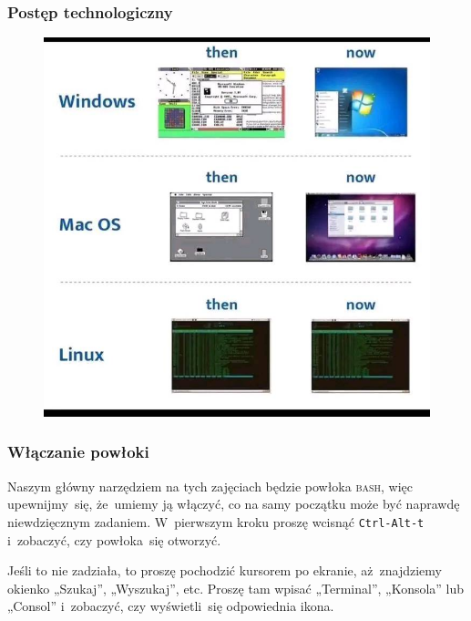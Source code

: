 \documentclass[10pt,t]{beamer}
\begin{document}
\begin{frame}
  \frametitle{Postęp technologiczny}

  \vspace{-0.5em}


  \begin{figure}

    \label{fig:Evolution-of-OS}

    \centering


    \includegraphics[scale=0.3]
    {./Presentations-pictures/Miscancellous-pictures/Evolution-of-operating-systems.jpg}

  \end{figure}

\end{frame}





\begin{frame}
  \frametitle{Włączanie powłoki}


  Naszym główny narzędziem na tych zajęciach będzie powłoka \textsc{bash},
  więc upewnijmy~się, że~umiemy ją włączyć, co na samy początku może być
  naprawdę niewdzięcznym zadaniem. W~pierwszym kroku proszę wcisnąć
  \texttt{Ctrl-Alt-t} i~zobaczyć, czy powłoka~się otworzyć.

  Jeśli to nie zadziała, to proszę pochodzić kursorem po ekranie,
  aż~znajdziemy okienko „Szukaj”, „Wyszukaj”, etc. Proszę tam wpisać
  „Terminal”, „Konsola” lub „Consol” i~zobaczyć, czy wyświetli~się
  odpowiednia ikona.

\end{frame}
\end{document}
